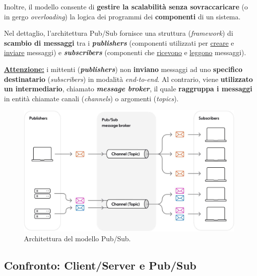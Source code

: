\documentclass[a4paper]{article}
\begin{document}
	\noindent
	Inoltre, il modello consente di \textbf{gestire la scalabilità senza sovraccaricare} (o in gergo \emph{overloading}) la logica dei programmi dei \textbf{componenti} di un sistema.\newline
	
	\noindent
	Nel dettaglio, l'architettura Pub/Sub fornisce una struttura (\emph{framework}) di \textbf{scambio di messaggi} tra i \textbf{\emph{publishers}} (componenti utilizzati per \underline{creare} e \underline{inviare} messaggi) e \textbf{\emph{subscribers}} (componenti che \underline{ricevono} e \underline{leggono} messaggi).\newline
	
	\noindent
	\textcolor{Red3}{\textbf{\underline{Attenzione:}}} i mittenti (\emph{\textbf{publishers}}) non \textbf{inviano} messaggi ad uno \textbf{specifico destinatario} (\emph{subscribers}) in modalità \emph{end-to-end}. Al contrario, viene \textbf{utilizzato un intermediario}, chiamato \textbf{\emph{message broker}}, il quale \textbf{raggruppa i messaggi} in entità chiamate canali (\emph{channels}) o argomenti (\emph{topics}).\newpage
	
	\begin{figure}[!htp]
		\centering
		\includegraphics[width=\textwidth]{img/pub-sub/pub-sub-architecture-overview.jpg}
		\caption{Architettura del modello Pub/Sub.}
	\end{figure}\newpage
	
	\subsection{Confronto: Client/Server e Pub/Sub}
	
\end{document}
